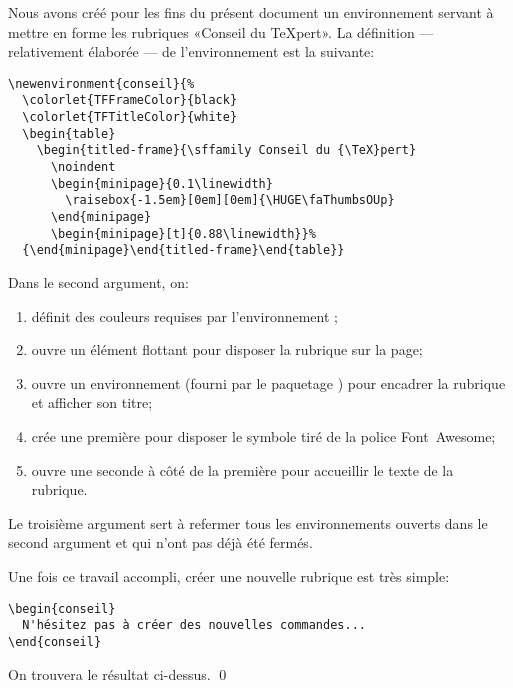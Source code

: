 \begin{exemple}
  Nous avons créé pour les fins du présent document un environnement
   servant à mettre en forme les rubriques «Conseil du
  {\TeX}pert». La définition --- relativement élaborée --- de
  l'environnement est la suivante:
\begin{lstlisting}
\newenvironment{conseil}{%
  \colorlet{TFFrameColor}{black}
  \colorlet{TFTitleColor}{white}
  \begin{table}
    \begin{titled-frame}{\sffamily Conseil du {\TeX}pert}
      \noindent
      \begin{minipage}{0.1\linewidth}
        \raisebox{-1.5em}[0em][0em]{\HUGE\faThumbsOUp}
      \end{minipage}
      \begin{minipage}[t]{0.88\linewidth}}%
  {\end{minipage}\end{titled-frame}\end{table}}
\end{lstlisting}
  Dans le second argument, on:
  \begin{enumerate}
  \item définit des couleurs requises par l'environnement
    ;
  \item ouvre un élément flottant pour disposer la rubrique sur la
    page;
  \item ouvre un environnement  (fourni par le paquetage
    ) pour encadrer la rubrique et afficher son titre;
  \item crée une première  pour disposer le symbole
    {\faThumbsOUp} tiré de la police Font~Awesome;
  \item ouvre une seconde  à côté de la première pour
    accueillir le texte de la rubrique.
  \end{enumerate}
  Le troisième argument sert à refermer tous les environnements
  ouverts dans le second argument et qui n'ont pas déjà été fermés.

  Une fois ce travail accompli, créer une nouvelle rubrique est très
  simple:
\begin{lstlisting}
\begin{conseil}
  N'hésitez pas à créer des nouvelles commandes...
\end{conseil}
\end{lstlisting}
  On trouvera le résultat ci-dessus. %
  \qed
\end{exemple}

